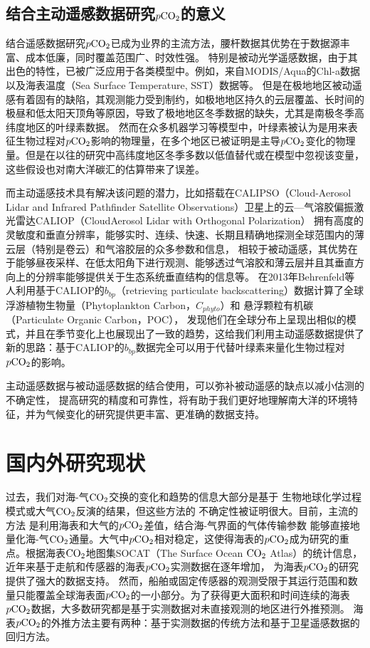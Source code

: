 \subsection{结合主动遥感数据研究\texorpdfstring{$p\rm CO_2$}{}的意义}
结合遥感数据研究$p\rm CO_2$已成为业界的主流方法，腰杆数据其优势在于数据源丰富、成本低廉，同时覆盖范围广、时效性强。
特别是被动光学遥感数据，由于其出色的特性，已被广泛应用于各类模型中。例如，来自MODIS/Aqua的Chl-a数据以及海表温度（Sea Surface Temperature, SST）数据等\cite{HBHH201803001}。
但是在极地地区被动遥感有着固有的缺陷，其观测能力受到制约，如极地地区持久的云层覆盖、长时间的极昼和低太阳天顶角等原因\cite{2013Space,bbp_Annual_2017}，导致了极地地区冬季数据的缺失，尤其是南极冬季高纬度地区的叶绿素数据。
然而在众多机器学习等模型中，叶绿素被认为是用来表征生物过程对$p\rm CO_2$影响的物理量，在多个地区已被证明是主导$p\rm CO_2$变化的物理量\cite{tu2021increase,brown2019enhanced}。但是在以往的研究中高纬度地区冬季多数以低值替代\cite{CSIR_ML6,gregor2017empirical,LSCE_FFNN}或在模型中忽视该变量\cite{JMA_MLR,MPI_SOMFFN}，
这些假设也对南大洋碳汇的估算带来了误差。

而主动遥感技术具有解决该问题的潜力，比如搭载在CALIPSO（Cloud-Aerosol Lidar and Infrared Pathfinder Satellite Observations）卫星上的云—气溶胶偏振激光雷达CALIOP（CloudAerosol Lidar with Orthogonal Polarization）
拥有高度的灵敏度和垂直分辨率，能够实时、连续、快速、长期且精确地探测全球范围内的薄云层（特别是卷云）和气溶胶层的众多参数和信息，
相较于被动遥感，其优势在于能够昼夜采样、在低太阳角下进行观测、能够透过气溶胶和薄云层并且其垂直方向上的分辨率能够提供关于生态系统垂直结构的信息等\cite{CALIPSO_2009}。
在2013年Behrenfeld等人\cite{2013Space}利用基于CALIOP的$b_{bp}$（retrieving particulate backscattering）数据计算了全球浮游植物生物量（Phytoplankton Carbon，$C_{phyto}$）和 悬浮颗粒有机碳（Particulate Organic Carbon，POC），
发现他们在全球分布上呈现出相似的模式，并且在季节变化上也展现出了一致的趋势，这给我们利用主动遥感数据提供了新的思路：基于CALIOP的$b_{bp}$数据完全可以用于代替叶绿素来量化生物过程对$p\rm CO_2$的影响。

主动遥感数据与被动遥感数据的结合使用，可以弥补被动遥感的缺点以减小估测的不确定性，
提高研究的精度和可靠性，将有助于我们更好地理解南大洋的环境特征，并为气候变化的研究提供更丰富、更准确的数据支持。


\section{国内外研究现状}
过去，我们对海-气$\rm CO_2$交换的变化和趋势的信息大部分是基于
生物地球化学过程模式或大气$\rm CO_2$反演的结果，但这些方法的
不确定性被证明很大\cite{Wanninkhof_2013}。目前，主流的方法
是利用海表和大气的$p\rm CO_2$差值，结合海-气界面的气体传输参数
能够直接地量化海-气$\rm CO_2$通量。大气中$p\rm CO_2$相对稳定，这使得海表的$p\rm CO_2$成为研究的重点。根据海表$\rm CO_2$地图集SOCAT\cite{socat2016}（The Surface Ocean $\rm CO_2$ Atlas）的统计信息，近年来基于走航和传感器的海表$p\rm CO_2$实测数据在逐年增加，
为海表$p\rm CO_2$的研究提供了强大的数据支持。
然而，船舶或固定传感器的观测受限于其运行范围和数量只能覆盖全球海表面$p\rm CO_2$的一小部分。为了获得更大面积和时间连续的海表$p\rm CO_2$数据，大多数研究都是基于实测数据对未直接观测的地区进行外推预测。
海表$p\rm CO_2$的外推方法主要有两种：基于实测数据的传统方法和基于卫星遥感数据的回归方法。

